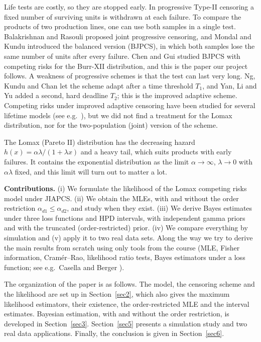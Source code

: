\documentclass[a4paper,11pt]{article}
\begin{document}
Life tests are costly, so they are stopped early. In progressive Type-II censoring a fixed number of surviving units is withdrawn at each failure. To compare the products of two production lines, one can use both samples in a single test. Balakrishnan and Rasouli \cite{balakrishnan2008} proposed joint progressive censoring, and Mondal and Kundu \cite{mondal2019} introduced the balanced version (BJPCS), in which both samples lose the same number of units after every failure. Chen and Gui \cite{chen2026} studied BJPCS with competing risks for the Burr-XII distribution, and this is the paper our project follows. A weakness of progressive schemes is that the test can last very long. Ng, Kundu and Chan \cite{ng2009} let the scheme adapt after a time threshold $T_1$, and Yan, Li and Yu \cite{yan2021} added a second, hard deadline $T_2$; this is the improved adaptive scheme. Competing risks under improved adaptive censoring have been studied for several lifetime models (see e.g.\ \cite{alotaibi2025}), but we did not find a treatment for the Lomax distribution, nor for the two-population (joint) version of the scheme.

The Lomax (Pareto II) distribution \cite{lomax1954} has the decreasing hazard $h(x)=\alpha\lambda/(1+\lambda x)$ and a heavy tail, which suits products with early failures. It contains the exponential distribution as the limit $\alpha\to\infty$, $\lambda\to0$ with $\alpha\lambda$ fixed, and this limit will turn out to matter a lot.

\textbf{Contributions.} (i) We formulate the likelihood of the Lomax competing risks model under JIAPCS. (ii) We obtain the MLEs, with and without the order restriction $\alpha_{d1}\le\alpha_{d2}$, and study when they exist. (iii) We derive Bayes estimates under three loss functions and HPD intervals, with independent gamma priors and with the truncated (order-restricted) prior. (iv) We compare everything by simulation and (v) apply it to two real data sets. Along the way we try to derive the main results from scratch using only tools from the course (MLE, Fisher information, Cram\'er--Rao, likelihood ratio tests, Bayes estimators under a loss function; see e.g.\ Casella and Berger \cite{casella2002}).

The organization of the paper is as follows. The model, the censoring scheme and the likelihood are set up in Section~\ref{sec2}, which also gives the maximum likelihood estimators, their existence, the order-restricted MLE and the interval estimates. Bayesian estimation, with and without the order restriction, is developed in Section~\ref{sec3}. Section~\ref{sec5} presents a simulation study and two real data applications. Finally, the conclusion is given in Section~\ref{sec6}.
\end{document}
